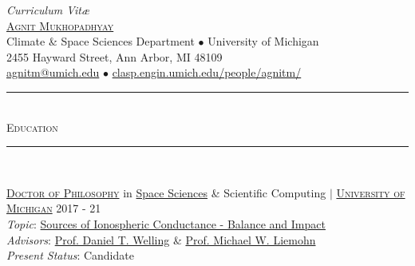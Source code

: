 \documentclass[10pt]{article}
\begin{document}
\thispagestyle{plain}

\begin{center}
{\Large \textit{Curriculum Vit\ae}}\\ \vspace{0.5em}
\href{http://clasp.engin.umich.edu/people/agnitm/}{\Huge\textsc{\lsstyle Agnit Mukhopadhyay}}\\ %
Climate \& Space Sciences Department $\bullet$ University of Michigan\\
2455 Hayward Street, Ann Arbor, MI 48109\\
\href{mailto:agnitm@umich.edu}{agnitm@umich.edu} $\bullet$
\href{https://clasp.engin.umich.edu/people/agnitm/}{clasp.engin.umich.edu/people/agnitm/}
\end{center}
\vspace{-1.75em}



\begin{center}
{\noindent\rule[0.5ex]{\linewidth}{0.5pt}\\
\vspace{-0.5em} \large{\textsc{Education}} \\
\vspace{-0.25em} \noindent\rule[0.5ex]{\linewidth}{0.5pt}}\\
\end{center}
\vspace{-0.75em}

\href{http://clasp.engin.umich.edu/academics/graduate/doctoral}{\textsc{Doctor of Philosophy}} in \href{http://clasp.engin.umich.edu/}{Space Sciences} \& Scientific Computing
$|$ \textsc{{\href{http://umich.edu/}{{University of Michigan}}}} \hfill {2017 - 21}\\
\emph{Topic}: \href{http://clasp.engin.umich.edu/research/space/MITPhysics}
{Sources of Ionospheric Conductance - Balance and Impact}\\
\emph{Advisors}: \href{https://www.uta.edu/physics/faculty/welling-daniel.php}{Prof. Daniel T. Welling} \& \href{http://clasp.engin.umich.edu/people/liemohn/FACULTY}{Prof. Michael W. Liemohn}\\
\emph{Present Status}: Candidate
\end{document}
